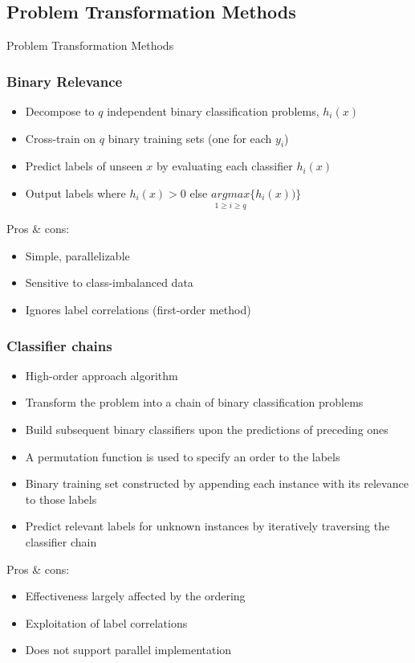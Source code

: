 \documentclass{beamer}
\begin{document}
\subsection{Problem Transformation Methods}
\begin{frame}
\Huge{\centerline{Problem Transformation Methods}}
\end{frame}
\begin{frame}
\frametitle{Binary Relevance}

\begin{itemize}
	\item Decompose to $q$ independent binary classification problems, $h_i(x)$
	\item Cross-train on $q$ binary training sets (one for each $y_i$)
	\item Predict labels of unseen $x$ by evaluating each classifier $h_i(x)$
	\item Output labels where  $h_i(x) > 0$ else $\underset{1 \geq i \geq q}{argmax} \{h_i(x))\}$ 
\end{itemize}

Pros \& cons:
\begin{itemize}
	\item Simple, parallelizable
	\item Sensitive to class-imbalanced data
	\item Ignores label correlations (first-order method)
\end{itemize}

\end{frame}

\begin{frame}
\frametitle{Classifier chains}
\begin{itemize}
	\item High-order approach algorithm
	\item Transform the problem into a chain of binary classification problems
	\item Build subsequent binary classifiers upon the predictions of preceding ones
	\item A permutation function is used to specify an order to the labels
	\item Binary training set
constructed by appending each instance with its relevance
to those labels
	\item Predict relevant labels for unknown instances by iteratively traversing the classifier chain
\end{itemize}

Pros \& cons:
\begin{itemize}
	\item Effectiveness largely affected by the ordering
	\item Exploitation of label correlations
	\item Does not support parallel implementation
\end{itemize}
\end{frame}
\end{document}
